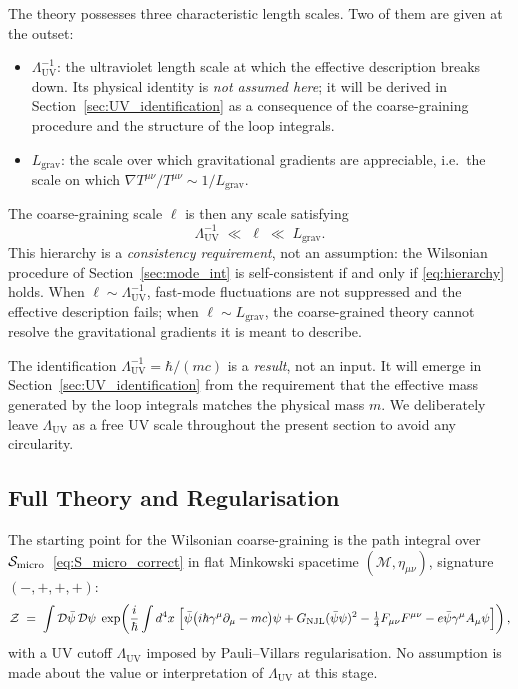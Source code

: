 \documentclass[11pt,a4paper]{article}
\theoremstyle{definition}
\theoremstyle{remark}
\begin{document}
	The theory possesses three characteristic length scales.  Two of them are
	given at the outset:
	\begin{itemize}
		\item $\Lambda_{\mathrm{UV}}^{-1}$: the ultraviolet length scale at which
		the effective description breaks down.  Its physical identity is
		\emph{not assumed here}; it will be derived in
		Section~\ref{sec:UV_identification} as a consequence of the
		coarse-graining procedure and the structure of the loop integrals.
		
		\item $L_{\mathrm{grav}}$: the scale over which gravitational gradients
		are appreciable, i.e.\ the scale on which $\nabla T^{\mu\nu}/T^{\mu\nu}
		\sim 1/L_{\mathrm{grav}}$.
	\end{itemize}
	The coarse-graining scale $\ell$ is then any scale satisfying
	\begin{equation}
		\Lambda_{\mathrm{UV}}^{-1} \;\ll\; \ell \;\ll\; L_{\mathrm{grav}}.
		\label{eq:hierarchy}
	\end{equation}
	This hierarchy is a \emph{consistency requirement}, not an assumption: the
	Wilsonian procedure of Section~\ref{sec:mode_int} is self-consistent if and
	only if \eqref{eq:hierarchy} holds.  When $\ell \sim \Lambda_{\mathrm{UV}}^{-1}$,
	fast-mode fluctuations are not suppressed and the effective description fails;
	when $\ell \sim L_{\mathrm{grav}}$, the coarse-grained theory cannot resolve
	the gravitational gradients it is meant to describe.
	
		The identification $\Lambda_{\mathrm{UV}}^{-1} = \hbar/(mc)$ is a \emph{result},
		not an input.  It will emerge in Section~\ref{sec:UV_identification} from the
		requirement that the effective mass generated by the loop integrals matches the
		physical mass $m$.  We deliberately leave $\Lambda_{\mathrm{UV}}$ as a free
		UV scale throughout the present section to avoid any circularity.
	
	\subsection{Full Theory and Regularisation}

	The starting point for the Wilsonian coarse-graining is the path integral over $\mathcal{S}_{\rm micro}$~\eqref{eq:S_micro_correct} in flat Minkowski spacetime $(\mathcal{M}, \eta_{\mu\nu})$, signature $(-,+,+,+)$:
	\begin{equation}
		\mathcal{Z} \;=\;
		\int \mathcal{D}\bar{\psi}\,\mathcal{D}\psi\;
		\exp\!\left(\frac{i}{\hbar}
		\int d^4x\;
		\Bigl[\bar{\psi}\bigl(i\hbar\gamma^\mu\partial_\mu - mc\bigr)\psi
		+ G_{\rm NJL}(\bar{\psi}\psi)^2
		- \tfrac{1}{4}F_{\mu\nu}F^{\mu\nu}
		- e\bar{\psi}\gamma^\mu A_\mu\psi\Bigr]
		\right),
		\label{eq:path_integral}
	\end{equation}
	with a UV cutoff $\Lambda_{\mathrm{UV}}$ imposed by Pauli--Villars regularisation.  No assumption is made about the value or interpretation of $\Lambda_{\mathrm{UV}}$ at this stage.
	
\end{document}
